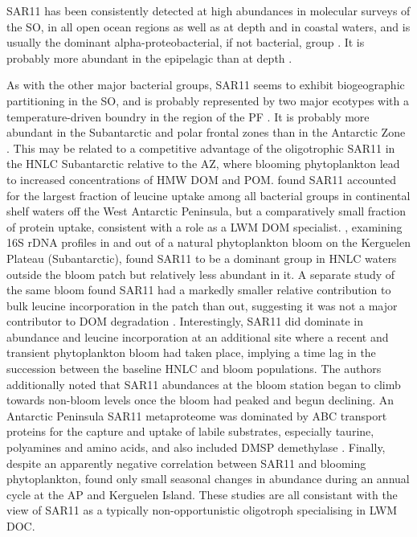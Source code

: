SAR11 has been consistently detected at high abundances in molecular surveys of the \ac{SO}, in all open ocean regions as well as at depth and in coastal waters, and is usually the dominant alpha-proteobacterial, if not bacterial, group \cite{Giebel:2009hr,Murray:2007db,LopezGarcia:2001vp,Straza:2010io,Jamieson:2012up,GarciaMartinez:2000fu,Ghiglione:2011ee,Murray:2011ib,Piquet:2011fj}.
It is probably more abundant in the epipelagic than at depth \cite{Giebel:2009hr}.

As with the other major bacterial groups, SAR11 seems to exhibit biogeographic partitioning in the \ac{SO}, and is probably represented by two major ecotypes with a temperature-driven boundry in the region of the \ac{PF} \cite{Brown:2012gna}.
It is probably more abundant in the Subantarctic and polar frontal zones than in the Antarctic Zone \cite{Giebel:2009hr,Ghiglione:2011ee}.
This may be related to a competitive advantage of the oligotrophic SAR11 in the \ac{HNLC} Subantarctic relative to the \ac{AZ}, where blooming phytoplankton lead to increased concentrations of \ac{HMW} \ac{DOM} and \ac{POM}.
\citet{Straza:2010io} found SAR11 accounted for the largest fraction of leucine uptake among all bacterial groups in continental shelf waters off the West Antarctic Peninsula, but a comparatively small fraction of protein uptake, consistent with a role as a \ac{LWM} \ac{DOM} specialist.
\citet{West:2008kc}, examining 16S rDNA profiles in and out of a natural phytoplankton bloom on the Kerguelen Plateau (Subantarctic), found SAR11 to be a dominant group in \ac{HNLC} waters outside the bloom patch but relatively less abundant in it.
A separate study of the same bloom found SAR11 had a markedly smaller relative contribution to bulk leucine incorporation in the patch than out, suggesting it was not a major contributor to \ac{DOM} degradation \cite{Obernosterer:2011df}.
Interestingly, SAR11 did dominate in abundance and leucine incorporation at an additional site where a recent and transient phytoplankton bloom had taken place, implying a time lag in the succession between the baseline \ac{HNLC} and bloom populations.
The authors additionally noted that SAR11 abundances at the bloom station began to climb towards non-bloom levels once the bloom had peaked and begun declining.
An Antarctic Peninsula SAR11 metaproteome was dominated by ABC transport proteins for the capture and uptake of labile substrates, especially taurine, polyamines and amino acids, and also included \ac{DMSP} demethylase \cite{Williams:2012bs}.
Finally, despite an apparently negative correlation between SAR11 and blooming phytoplankton, \citet{Ghiglione:2011ee} found only small seasonal changes in abundance during an annual cycle at the \ac{AP} and Kerguelen Island.
These studies are all consistant with the view of SAR11 as a typically non-opportunistic oligotroph specialising in \ac{LWM} \ac{DOC}.

